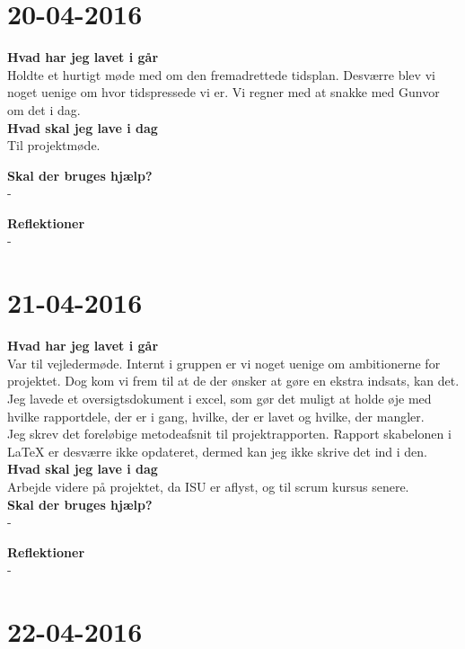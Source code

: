 \documentclass{article}
\begin{document}
	
	
	\section{20-04-2016}
	
	\textbf{Hvad har jeg lavet i går}\\
	Holdte et hurtigt møde med om den fremadrettede tidsplan. Desværre blev vi noget uenige om hvor tidspressede vi er. Vi regner med at snakke med Gunvor om det i dag.\\
	
	\textbf{Hvad skal jeg lave i dag}\\
	Til projektmøde.
	
	\textbf{Skal der bruges hjælp?}\\
	-
	
	\textbf{Reflektioner}\\
	-
	
	
	
	\section{21-04-2016}
	
	\textbf{Hvad har jeg lavet i går}\\
	Var til vejledermøde. Internt i gruppen er vi noget uenige om ambitionerne for projektet. Dog kom vi frem til at de der ønsker at gøre en ekstra indsats, kan det.\\
	Jeg lavede et oversigtsdokument i excel, som gør det muligt at holde øje med hvilke rapportdele, der er i gang, hvilke, der er lavet og hvilke, der mangler.\\
	Jeg skrev det foreløbige metodeafsnit til projektrapporten. Rapport skabelonen i LaTeX er desværre ikke opdateret, dermed kan jeg ikke skrive det ind i den.\\ 
	
	\textbf{Hvad skal jeg lave i dag}\\
	Arbejde videre på projektet, da ISU er aflyst, og til scrum kursus senere.\\
	
	\textbf{Skal der bruges hjælp?}\\
	-
	
	\textbf{Reflektioner}\\
	-
	
	
	
	\section{22-04-2016}
	
\end{document}
